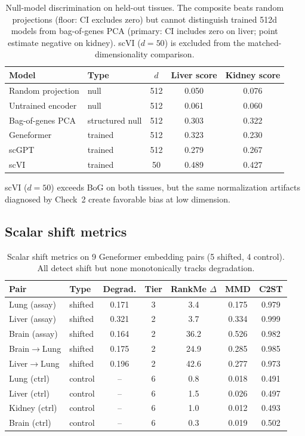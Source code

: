 \documentclass[11pt]{article}
\begin{document}
\begin{table}[h!]
\centering
\caption{Null-model discrimination on held-out tissues. The composite beats random projections (floor: CI excludes zero) but cannot distinguish trained 512d models from bag-of-genes PCA (primary: CI includes zero on liver; point estimate negative on kidney). scVI ($d = 50$) is excluded from the matched-dimensionality comparison.}
\label{tab:v6b}
\small
\begin{tabular}{@{}llccc@{}}
\toprule
Model & Type & $d$ & Liver score & Kidney score \\
\midrule
Random projection & null & 512 & 0.050 & 0.076 \\
Untrained encoder & null & 512 & 0.061 & 0.060 \\
\midrule
Bag-of-genes PCA & structured null & 512 & 0.303 & 0.322 \\
\midrule
Geneformer & trained & 512 & 0.323 & 0.230 \\
scGPT & trained & 512 & 0.279 & 0.267 \\
scVI & trained & 50 & 0.489 & 0.427 \\
\bottomrule
\end{tabular}
\end{table}

scVI ($d = 50$) exceeds BoG on both tissues, but the same normalization artifacts diagnosed by Check~2 create favorable bias at low dimension.

\subsection{Scalar shift metrics}
\label{app:scalar}

\begin{table}[h!]
\centering
\caption{Scalar shift metrics on 9 Geneformer embedding pairs (5 shifted, 4 control). All detect shift but none monotonically tracks degradation.}
\label{tab:scalar}
\small
\begin{tabular}{@{}llccccc@{}}
\toprule
Pair & Type & Degrad. & Tier & RankMe $\Delta$ & MMD & C2ST \\
\midrule
Lung (assay)  & shifted & 0.171 & 3 & 3.4  & 0.175 & 0.979 \\
Liver (assay) & shifted & 0.321 & 2 & 3.7  & 0.334 & 0.999 \\
Brain (assay) & shifted & 0.164 & 2 & 36.2 & 0.526 & 0.982 \\
Brain$\to$Lung  & shifted & 0.175 & 2 & 24.9 & 0.285 & 0.985 \\
Liver$\to$Lung  & shifted & 0.196 & 2 & 42.6 & 0.277 & 0.973 \\
\midrule
Lung (ctrl)   & control & -- & 6 & 0.8 & 0.018 & 0.491 \\
Liver (ctrl)  & control & -- & 6 & 1.5 & 0.026 & 0.497 \\
Kidney (ctrl) & control & -- & 6 & 1.0 & 0.012 & 0.493 \\
Brain (ctrl)  & control & -- & 6 & 0.3 & 0.019 & 0.502 \\
\bottomrule
\end{tabular}
\end{table}
\end{document}
